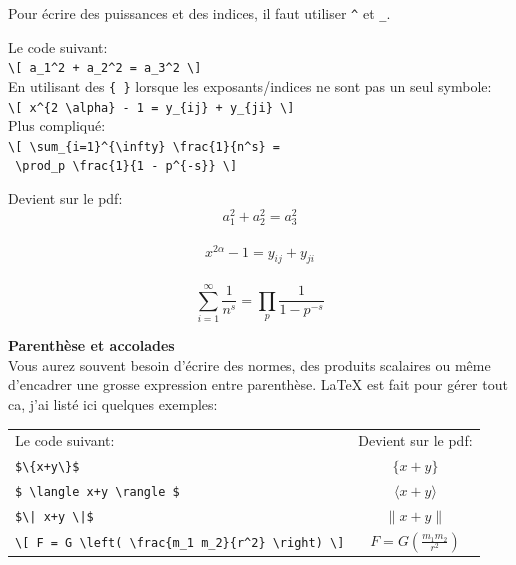 \documentclass[11pt]{article}				%
\begin{document}
Pour écrire des puissances et des indices, il faut utiliser \verb|^| et \verb|_|.

\begin{multicols}{2}
Le code suivant:\\

\verb|\[ a_1^2 + a_2^2 = a_3^2 \]| \\

En utilisant des \texttt{\{ \}} lorsque les exposants/indices ne sont pas un seul symbole:\\

\verb|\[ x^{2 \alpha} - 1 = y_{ij} + y_{ji} \]|\\

Plus compliqué:\\

\verb|\[ \sum_{i=1}^{\infty} \frac{1}{n^s} =| \\
\verb| \prod_p \frac{1}{1 - p^{-s}} \] |

\columnbreak
\centering
Devient sur le pdf:\\

$$ a_1^2 + a_2^2 = a_3^2$$\\
$$ x^{2 \alpha} - 1 = y_{ij} + y_{ji} $$\\
\[ \sum_{i=1}^{\infty} \frac{1}{n^s} = \prod_p \frac{1}{1 - p^{-s}} \]

\end{multicols}

\textbf{Parenthèse et accolades}\\

Vous aurez souvent besoin d'écrire des normes, des produits scalaires ou même d'encadrer une grosse expression entre parenthèse. LaTeX est fait pour gérer tout ca, j'ai listé ici quelques exemples:\\

\begin{tabular}{lc}
\vspace{11pt} Le code suivant: & Devient sur le pdf:\\
	
\verb|$\{x+y\}$| & $ \{x+y\} $ \\

\verb|$ \langle x+y \rangle $| & $ \langle x+y \rangle $ \\

\verb?$\| x+y \|$? & $\| x+y \|$ \\

\verb|\[ F = G \left( \frac{m_1 m_2}{r^2} \right) \]| & $ F = G \left( \frac{m_1 m_2}{r^2} \right) $ \\

\end{tabular}\\
\end{document}
